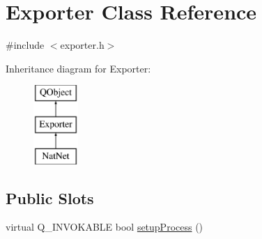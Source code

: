 \hypertarget{class_exporter}{\section{Exporter Class Reference}
\label{class_exporter}
}


{\ttfamily \#include $<$exporter.\-h$>$}

Inheritance diagram for Exporter\-:\begin{figure}[H]
\begin{center}
\leavevmode
\includegraphics[height=3.000000cm]{class_exporter}
\end{center}
\end{figure}
\subsection*{Public Slots}
\begin{DoxyCompactItemize}
\item 
virtual Q\-\_\-\-I\-N\-V\-O\-K\-A\-B\-L\-E bool \hyperlink{group___mo_cap_plugin_gad43c05ef37398dad0c09a5103beb27d8}{setup\-Process} ()
\end{DoxyCompactItemize}

